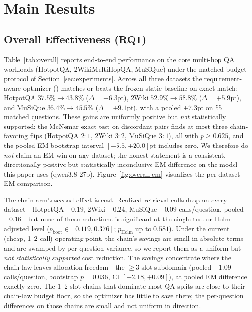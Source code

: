 \section{Main Results}
\label{sec:results}

\subsection{Overall Effectiveness (RQ1)}
Table~\ref{tab:overall} reports end-to-end performance on the core multi-hop
QA workloads (HotpotQA, 2WikiMultiHopQA, MuSiQue) under the matched-budget
protocol of Section~\ref{sec:experiments}. Across all three datasets the
requirement-aware optimizer () matches or beats the
frozen static baseline on exact-match: HotpotQA $37.5\%\to43.8\%$
($\Delta{=}{+}6.3$pt), 2Wiki $52.9\%\to58.8\%$ ($\Delta{=}{+}5.9$pt), and
MuSiQue $36.4\%\to45.5\%$ ($\Delta{=}{+}9.1$pt), with a pooled
$+7.3$pt on 55 matched questions. These gains are uniformly positive but
\emph{not} statistically supported: the McNemar exact test on discordant pairs
finds at most three chain-favoring flips (HotpotQA $2{:}1$, 2Wiki $3{:}2$,
MuSiQue $3{:}1$), all with $p\geq 0.625$, and the pooled EM bootstrap interval
$[-5.5,+20.0]$pt includes zero. We therefore do \emph{not} claim an EM win on
any dataset; the honest statement is a consistent, directionally positive but
statistically inconclusive EM difference on the model this paper uses
(qwen3.8-27b). Figure~\ref{fig:overall-em} visualizes the per-dataset EM
comparison.

The chain arm's second effect is cost. Realized retrieval calls drop on every
dataset---HotpotQA $-0.19$, 2Wiki $-0.24$, MuSiQue $-0.09$ calls/question,
pooled $-0.16$---but none of these reductions is significant at the
single-test or Holm-adjusted level ($p_{\text{boot}}\in[0.119,0.376]$;
$p_{\text{Holm}}$ up to $0.581$). Under the current (cheap, 1--2 call)
operating point, the chain's savings are small in absolute terms and are
swamped by per-question variance, so we report them as a uniform but
\emph{not statistically supported} cost reduction. The savings concentrate
where the chain law leaves allocation freedom---the $\ge 3$-slot subdomain
(pooled $-1.09$ calls/question, bootstrap $p=0.036$, CI $[-2.18,+0.09]$), at
pooled EM difference exactly zero. The $1$--$2$-slot chains that dominate most QA
splits are close to their chain-law budget floor, so the optimizer has little to
save there; the per-question differences on those chains are small and not
uniform in direction.

